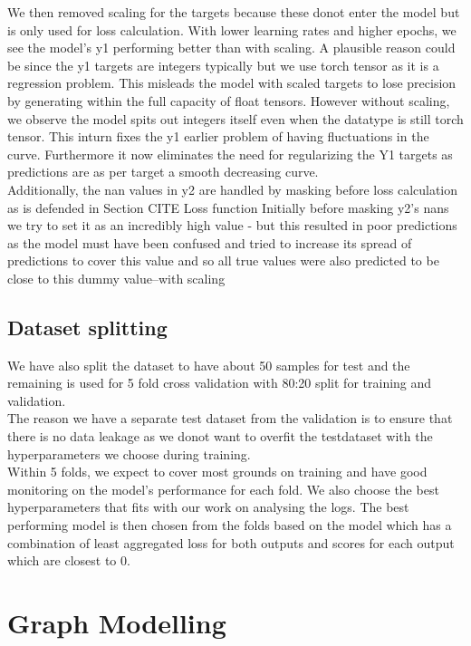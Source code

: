 \documentclass{report} %
\begin{document}
We then removed scaling for the targets because these donot enter the model but is only used for loss calculation.
With lower learning rates and higher epochs, we see the model's y1 performing better than with scaling.
A plausible reason could be since the y1 targets are integers typically but we use torch tensor as it is a regression problem. This misleads the model with scaled targets to lose precision by generating within the full capacity of float tensors.
However without scaling, we observe the model spits out integers itself even when the datatype is still torch tensor. This inturn fixes the y1 earlier problem of having fluctuations in the curve.
Furthermore it now eliminates the need for regularizing the Y1 targets as predictions are as per target a smooth decreasing curve.\\

Additionally, the nan values in y2 are handled by masking before loss calculation as is defended in Section CITE Loss function
Initially before masking y2's nans we try to set it as an incredibly high value - but this resulted in poor predictions as the model must have been confused and tried to increase its spread of predictions to cover this value and so all true values were also predicted to be close to this dummy value--with scaling

\section{Dataset splitting}\label{sec:Dataset splitting}

We have also split the dataset to have about 50 samples for test and the remaining is used for 5 fold cross validation with 80:20 split for training and validation. \\
The reason we have a separate test dataset from the validation is to ensure that there is no data leakage as we donot want to overfit the testdataset with the hyperparameters we choose during training. \\

Within 5 folds, we expect to cover most grounds on training and have good monitoring on the model's performance for each fold.
We also choose the best hyperparameters that fits with our work on analysing the logs.
The best performing model is then chosen from the folds based on the model which has a combination of least aggregated loss for both outputs and scores for each output which are closest to 0.


\chapter{Graph Modelling} 
\end{document}
